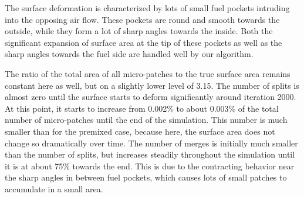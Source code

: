 %
The surface deformation is characterized by lots of small fuel pockets intruding
into the opposing air flow.
%
These pockets are round and smooth towards the outside, while they form a lot of
sharp angles towards the inside.
%
Both the significant expansion of surface area at the tip of these pockets as
well as the sharp angles towards the fuel side are handled well by our
algorithm.
%

%
The ratio of the total area of all micro-patches to the true surface area
remains constant here as well, but on a slightly lower level of 3.15.
%
The number of splits is almost zero until the surface starts to deform
significantly around iteration \num{2000}.
%
At this point, it starts to increase from 0.002\% to about 0.003\% of the total
number of micro-patches until the end of the simulation.
%
This number is much smaller than for the premixed case, because here, the
surface area does not change so dramatically over time.
%
The number of merges is initially much smaller than the number of splits, but
increases steadily throughout the simulation until it is at about 75\% towards
the end.
%
This is due to the contracting behavior near the sharp angles in between fuel
pockets, which causes lots of small patches to accumulate in a small area.
%
%
